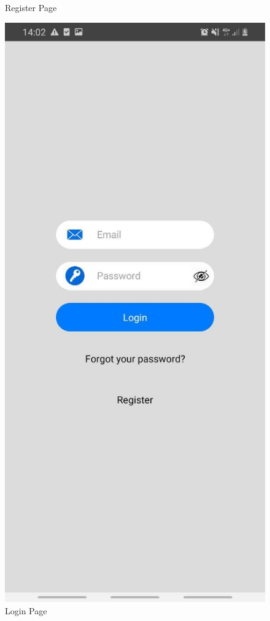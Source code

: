 \begin{figure}[h!]
\begin{minipage}[t]{0.48\textwidth}
\caption{Register Page}
\label{fig:Register}
\end{minipage}
\hspace*{\fill} %
\begin{minipage}[t]{0.48\textwidth}
\includegraphics[width=\linewidth,keepaspectratio=true]{img/register.jpg}
\caption{Login Page}
\label{fig:Login}
\end{minipage}
\end{figure}


